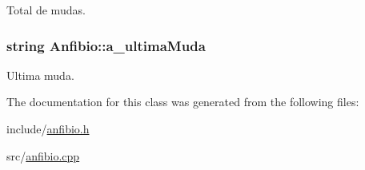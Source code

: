 Total de mudas. 

\subsubsection[{\texorpdfstring{a\+\_\+ultima\+Muda}{a_ultimaMuda}}]{\setlength{\rightskip}{0pt plus 5cm}string Anfibio\+::a\+\_\+ultima\+Muda\hspace{0.3cm}{\ttfamily [protected]}}\hypertarget{classAnfibio_a674f19d430b4781216fac1fee2567771}{}\label{classAnfibio_a674f19d430b4781216fac1fee2567771}


Ultima muda. 



The documentation for this class was generated from the following files\+:\begin{DoxyCompactItemize}
\item 
include/\hyperlink{anfibio_8h}{anfibio.\+h}\item 
src/\hyperlink{anfibio_8cpp}{anfibio.\+cpp}\end{DoxyCompactItemize}

